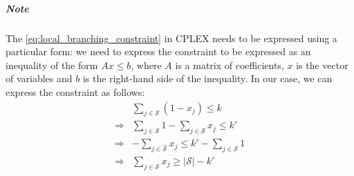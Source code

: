 \documentclass{article}
\begin{document}
\subparagraph{Note}
The \ref{eq:local_branching_constraint} in CPLEX needs to be expressed using a particular form: we need to express the constraint
to be expressed as an inequality of the form $Ax \leq b$, where $A$ is a matrix of coefficients, $x$ is the vector of variables and $b$ is the right-hand side of the inequality.
In our case, we can express the constraint as follows:
\begin{align}
	& \sum_{j \in \mathcal{S}} (1 - x_j) \leq k \\
	\Rightarrow & \sum_{j \in \mathcal{S}}1 -\sum_{j \in \mathcal{S}} x_j \leq k' \\
	\Rightarrow & -\sum_{j \in \hat{\mathcal{S}}} x_j \leq k' - \sum_{j \in \mathcal{S}}1 \\
	\Rightarrow & \sum_{j \in \mathcal{S}} x_j \geq |\mathcal{S}| - k'
\end{align}
\newpage





\end{document}
